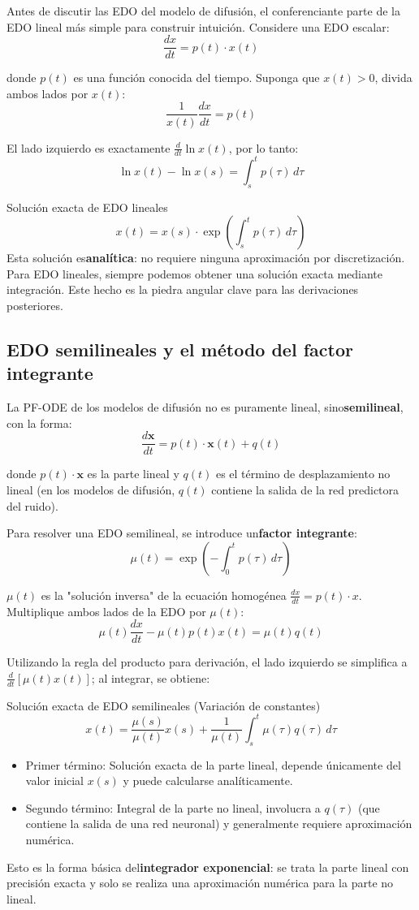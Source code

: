\documentclass[a4paper]{article}
\begin{document}
Antes de discutir las EDO del modelo de difusión, el conferenciante parte de la EDO lineal más simple para construir intuición. Considere una EDO escalar:
$$\frac{dx}{dt} = p(t) \cdot x(t)$$

donde $p(t)$ es una función conocida del tiempo. Suponga que $x(t) > 0$, divida ambos lados por $x(t)$:
$$\frac{1}{x(t)} \frac{dx}{dt} = p(t)$$

El lado izquierdo es exactamente $\frac{d}{dt} \ln x(t)$, por lo tanto:
$$\ln x(t) - \ln x(s) = \int_s^t p(\tau)\, d\tau$$

\begin{importantbox}{Solución exacta de EDO lineales}
$$x(t) = x(s) \cdot \exp\left(\int_s^t p(\tau)\, d\tau\right)$$
Esta solución es\textbf{analítica}: no requiere ninguna aproximación por discretización. Para EDO lineales, siempre podemos obtener una solución exacta mediante integración. Este hecho es la piedra angular clave para las derivaciones posteriores.
\end{importantbox}

\subsection{EDO semilineales y el método del factor integrante}

La PF-ODE de los modelos de difusión no es puramente lineal, sino\textbf{semilineal}, con la forma:
$$\frac{d\mathbf{x}}{dt} = p(t) \cdot \mathbf{x}(t) + q(t)$$

donde $p(t) \cdot \mathbf{x}$ es la parte lineal y $q(t)$ es el término de desplazamiento no lineal (en los modelos de difusión, $q(t)$ contiene la salida de la red predictora del ruido).

Para resolver una EDO semilineal, se introduce un\textbf{factor integrante}:
$$\mu(t) = \exp\left(-\int_0^t p(\tau)\, d\tau\right)$$

$\mu(t)$ es la "solución inversa" de la ecuación homogénea $\frac{dx}{dt} = p(t) \cdot x$. Multiplique ambos lados de la EDO por $\mu(t)$:
$$\mu(t) \frac{dx}{dt} - \mu(t) p(t) x(t) = \mu(t) q(t)$$

Utilizando la regla del producto para derivación, el lado izquierdo se simplifica a $\frac{d}{dt}\left[\mu(t) x(t)\right]$; al integrar, se obtiene:

\begin{importantbox}{Solución exacta de EDO semilineales (Variación de constantes)}
$$x(t) = \frac{\mu(s)}{\mu(t)} x(s) + \frac{1}{\mu(t)} \int_s^t \mu(\tau) q(\tau)\, d\tau$$
\begin{itemize}
    \item Primer término: Solución exacta de la parte lineal, depende únicamente del valor inicial $x(s)$ y puede calcularse analíticamente.
    \item Segundo término: Integral de la parte no lineal, involucra a $q(\tau)$ (que contiene la salida de una red neuronal) y generalmente requiere aproximación numérica.
\end{itemize}
Esto es la forma básica del\textbf{integrador exponencial}: se trata la parte lineal con precisión exacta y solo se realiza una aproximación numérica para la parte no lineal.
\end{importantbox}
\end{document}
